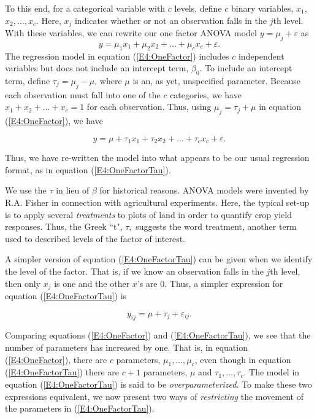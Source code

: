 To this end, for a categorical variable with $c$ levels, define $c$
binary variables, $x_{1},$ $x_{2},\ldots ,x_{c}$. Here, $x_{j}$
indicates whether or not an observation falls in the $j$th level.
With these variables, we can rewrite our one factor ANOVA model $
y=\mu _{j}+ \varepsilon$ as
\begin{equation}\label{E4:OneFactor}
y=\mu _{1}x_{1}+\mu _{2}x_{2}+\ldots +\mu _{c}x_{c}+\varepsilon.
\end{equation}
The regression model in equation (\ref{E4:OneFactor}) includes $c$
independent variables but does not include an intercept term, $\beta
_{0}$. To include an intercept term, define $\tau _{j}=\mu _{j}-\mu
$, where $\mu $ is an, as yet, unspecified parameter. Because each
observation must fall into one of the $c$ categories, we have
$x_{1}+x_{2}+\ldots +x_{c}=1$ for each observation. Thus, using $\mu
_{j} = \tau_j + \mu $ in equation (\ref{E4:OneFactor}), we have

\begin{equation}\label{E4:OneFactorTau}
y=\mu +\tau _{1}x_{1}+\tau _{2}x_{2}+\ldots +\tau
_{c}x_{c}+\varepsilon.
\end{equation}

\noindent Thus, we have re-written the model into what appears to be
our usual regression format, as in equation (\ref{E4:OneFactorTau}).

We use the $\tau $ in lieu of $\beta $ for historical reasons. ANOVA
models were invented by R.A. Fisher in connection with agricultural
experiments. Here, the typical set-up is to apply several
\textit{treatments} to plots of land in order to quantify crop yield
responses. Thus, the Greek ``t", $\tau ,$ suggests the word
treatment, another term used to described levels of the factor of
interest.

A simpler version of equation (\ref{E4:OneFactorTau}) can be given
when we identify the level of the factor. That is, if we know an
observation falls in the $j$th level, then only $x_{j}$ is one and
the other $x$'s are 0. Thus, a simpler expression for equation
(\ref{E4:OneFactorTau}) is

\begin{equation*}
y_{ij}=\mu +\tau_{j} + \varepsilon_{ij}.
\end{equation*}

Comparing equations (\ref{E4:OneFactor}) and
(\ref{E4:OneFactorTau}), we see that the number of parameters
has increased by one. That is, in equation (\ref{E4:OneFactor}), there are $c$ parameters, $%
\mu _{1},\ldots ,\mu _{c}$, even though in equation
(\ref{E4:OneFactorTau}) there are $c+1$ parameters, $\mu $ and $\tau
_{1},\ldots ,\tau _{c}$. The model in equation
(\ref{E4:OneFactorTau}) is said to be \textit{overparameterized}. To
make these two expressions equivalent, we now present two ways of
\textit{restricting} the movement of the parameters in
(\ref{E4:OneFactorTau}).

